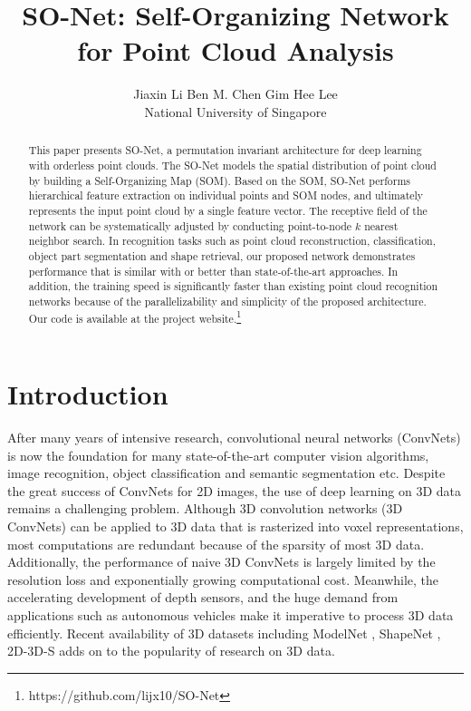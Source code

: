 \documentclass[10pt,twocolumn,letterpaper]{article}
\begin{document}
\title{SO-Net: Self-Organizing Network for Point Cloud Analysis}

\author{Jiaxin Li \qquad Ben M. Chen \qquad Gim Hee Lee \\
National University of Singapore
}

\maketitle



\begin{abstract}
This paper presents SO-Net, a permutation invariant architecture for deep learning with orderless point clouds. The SO-Net models the spatial distribution of point cloud by building a Self-Organizing Map (SOM). Based on the SOM, SO-Net performs hierarchical feature extraction on individual points and SOM nodes, and ultimately represents the input point cloud by a single feature vector. The receptive field of the network can be systematically adjusted by conducting point-to-node $k$ nearest neighbor search. In recognition tasks such as point cloud reconstruction, classification, object part segmentation and shape retrieval, our proposed network demonstrates performance that is similar with or better than state-of-the-art approaches. In addition, the training speed is significantly faster than existing point cloud recognition networks because of the parallelizability and simplicity of the proposed architecture. Our code is available at the project website.\footnote{https://github.com/lijx10/SO-Net}

\end{abstract}
\section{Introduction} \label{sec_intro}
After many years of intensive research, convolutional neural networks (ConvNets) is now the foundation for many state-of-the-art computer vision algorithms, \eg image recognition, object classification and semantic segmentation etc. Despite the great success of ConvNets for 2D images, the use of deep learning on 3D data remains a challenging problem. Although 3D convolution networks (3D ConvNets) can be applied to 3D data that is rasterized into voxel representations, most computations are redundant because of the sparsity of most 3D data. Additionally, the performance of naive 3D ConvNets is largely limited by the resolution loss and exponentially growing computational cost. Meanwhile, the accelerating development of depth sensors, and the huge demand from applications such as autonomous vehicles make it imperative to process 3D data efficiently. Recent availability of 3D datasets including ModelNet \cite{wu20153d}, ShapeNet \cite{chang2015shapenet}, 2D-3D-S \cite{2017arXiv170201105A} adds on to the popularity of research on 3D data. 
\end{document}
